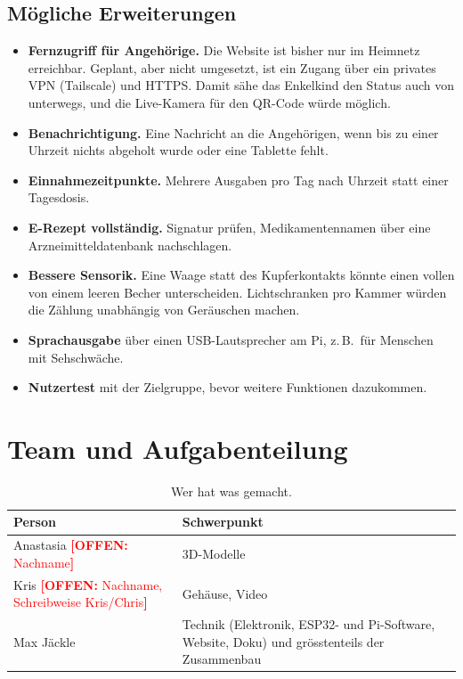 \documentclass[11pt,a4paper]{article}
\newcommand{\offen}[1]{\textcolor{red}{\textbf{[OFFEN:} #1\textbf{]}}}
\newcommand{\maxname}{Max Jäckle}
\newcommand{\stasianame}{Anastasia \offen{Nachname}}
\newcommand{\krisname}{Kris \offen{Nachname, Schreibweise Kris/Chris}}
\begin{document}
\subsection{Mögliche Erweiterungen}
\label{sec:erweiterungen}

\begin{itemize}
\item \textbf{Fernzugriff für Angehörige.} Die Website ist bisher nur im Heimnetz erreichbar. Geplant, aber nicht
  umgesetzt, ist ein Zugang über ein privates VPN (Tailscale) und HTTPS. Damit sähe das Enkelkind den Status
  auch von unterwegs, und die Live-Kamera für den QR-Code würde möglich.
\item \textbf{Benachrichtigung.} Eine Nachricht an die Angehörigen, wenn bis zu einer Uhrzeit nichts abgeholt
  wurde oder eine Tablette fehlt.
\item \textbf{Einnahmezeitpunkte.} Mehrere Ausgaben pro Tag nach Uhrzeit statt einer Tagesdosis.
\item \textbf{E-Rezept vollständig.} Signatur prüfen, Medikamentennamen über eine Arzneimitteldatenbank nachschlagen.
\item \textbf{Bessere Sensorik.} Eine Waage statt des Kupferkontakts könnte einen vollen von einem leeren Becher
  unterscheiden. Lichtschranken pro Kammer würden die Zählung unabhängig von Geräuschen machen.
\item \textbf{Sprachausgabe} über einen USB-Lautsprecher am Pi, z.\,B.\ für Menschen mit Sehschwäche.
\item \textbf{Nutzertest} mit der Zielgruppe, bevor weitere Funktionen dazukommen.
\end{itemize}

\section{Team und Aufgabenteilung}

\begin{table}[H]
\centering
\small
\begin{tabularx}{\linewidth}{@{}l Y@{}}
\toprule
\textbf{Person} & \textbf{Schwerpunkt} \\
\midrule
\stasianame & 3D-Modelle \\
\krisname & Gehäuse, Video \\
\maxname & Technik (Elektronik, ESP32- und Pi-Software, Website, Doku) und grösstenteils der Zusammenbau \\
\bottomrule
\end{tabularx}
\caption{Wer hat was gemacht.}
\end{table}
\end{document}
